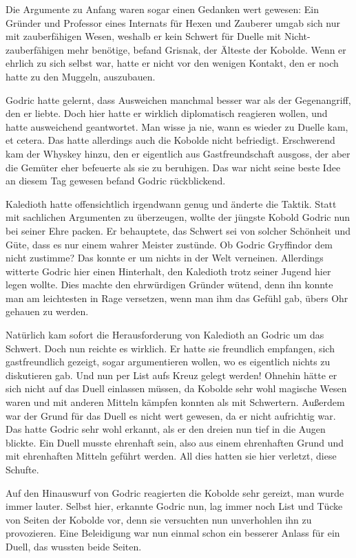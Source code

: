 \documentclass[fontsize=12pt]{scrartcl}
\begin{document}
	Die Argumente zu Anfang waren sogar einen Gedanken wert gewesen: Ein Gründer und Professor eines Internats für Hexen und Zauberer umgab sich nur mit zauberfähigen Wesen, weshalb er kein Schwert für Duelle mit Nicht-zauberfähigen mehr benötige, befand Grisnak, der Älteste der Kobolde. Wenn er ehrlich zu sich selbst war, hatte er nicht vor den wenigen Kontakt, den er noch hatte zu den Muggeln, auszubauen. 
	
	Godric hatte gelernt, dass Ausweichen manchmal besser war als der Gegenangriff, den er liebte. Doch hier hatte er wirklich diplomatisch reagieren wollen, und hatte ausweichend geantwortet. Man wisse ja nie, wann es wieder zu Duelle kam, et cetera. Das hatte allerdings auch die Kobolde nicht befriedigt. Erschwerend kam der Whyskey hinzu, den er eigentlich aus Gastfreundschaft ausgoss, der aber die Gemüter eher befeuerte als sie zu beruhigen. Das war nicht seine beste Idee an diesem Tag gewesen befand Godric rückblickend. 
	
	Kaledioth hatte offensichtlich irgendwann genug und änderte die Taktik. Statt mit sachlichen Argumenten zu überzeugen, wollte der jüngste Kobold Godric nun bei seiner Ehre packen. Er behauptete, das Schwert sei von solcher Schönheit und Güte, dass es nur einem wahrer Meister zustünde. Ob Godric Gryffindor dem nicht zustimme? Das konnte er um nichts in der Welt verneinen. Allerdings witterte Godric hier einen Hinterhalt, den Kaledioth trotz seiner Jugend hier legen wollte. Dies machte den ehrwürdigen Gründer wütend, denn ihn konnte man am leichtesten in Rage versetzen, wenn man ihm das Gefühl gab, übers Ohr gehauen zu werden. 
	
	Natürlich kam sofort die Herausforderung von Kaledioth an Godric um das Schwert. Doch nun reichte es wirklich. Er hatte sie freundlich empfangen, sich gastfreundlich gezeigt, sogar argumentieren wollen, wo es eigentlich nichts zu diskutieren gab. Und nun per List aufs Kreuz gelegt werden! Ohnehin hätte er sich nicht auf das Duell einlassen müssen, da Kobolde sehr wohl magische Wesen waren und mit anderen Mitteln kämpfen konnten als mit Schwertern. Außerdem war der Grund für das Duell es nicht wert gewesen, da er nicht aufrichtig war. Das hatte Godric sehr wohl erkannt, als er den dreien nun tief in die Augen blickte. Ein Duell musste ehrenhaft sein, also aus einem ehrenhaften Grund und mit ehrenhaften Mitteln geführt werden. All dies hatten sie hier verletzt, diese Schufte. 
	
	Auf den Hinauswurf von Godric reagierten die Kobolde sehr gereizt, man wurde immer lauter. Selbst hier, erkannte Godric nun, lag immer noch List und Tücke von Seiten der Kobolde vor, denn sie versuchten nun unverhohlen ihn zu provozieren. Eine Beleidigung war nun einmal schon ein besserer Anlass für ein Duell, das wussten beide Seiten. 
	
\end{document}
